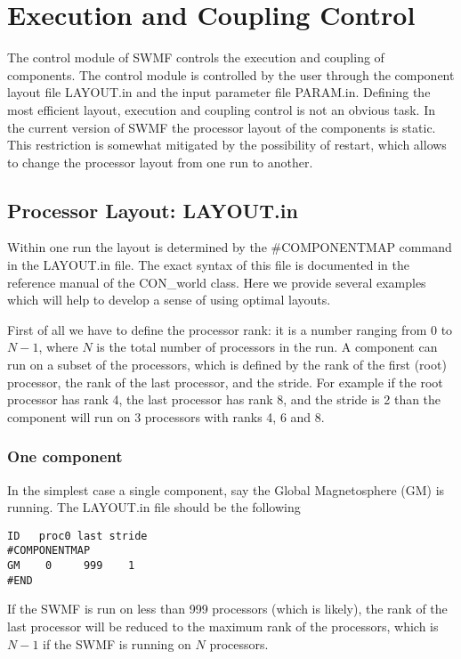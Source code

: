 \section{Execution and Coupling Control}

The control module of SWMF controls the execution and coupling of
components. The control module is controlled by the user through the
component layout file LAYOUT.in and the input parameter file PARAM.in.
Defining the most efficient layout, execution and coupling control
is not an obvious task. In the current version of SWMF the processor
layout of the components is static. This restriction is somewhat
mitigated by the possibility of restart, which allows to change
the processor layout from one run to another.

\subsection{Processor Layout: LAYOUT.in}

Within one run the layout is determined by the \#COMPONENTMAP
command in the LAYOUT.in file. The exact syntax of this file
is documented in the reference manual of the CON\_world class.
Here we provide several examples which will help to develop
a sense of using optimal layouts.

First of all we have to define the processor rank:
it is a number ranging from 0 to $N-1$, where
$N$ is the total number of processors in the run. 
A component can run on a subset of the processors,
which is defined by the rank of the first (root) processor,
the rank of the last processor, and the stride. For
example if the root processor has rank 4, the last processor
has rank 8, and the stride is 2 than the component will
run on 3 processors with ranks 4, 6 and 8.

\subsubsection{One component}

In the simplest case a single component, say the Global
Magnetosphere (GM) is running. The LAYOUT.in file should be
the following
\begin{verbatim}
ID   proc0 last stride
#COMPONENTMAP
GM    0     999    1
#END
\end{verbatim}
If the SWMF is run on less than 999 processors (which is likely),
the rank of the last processor will be reduced to the maximum
rank of the processors, which is $N-1$ if the SWMF is running on $N$
processors.

